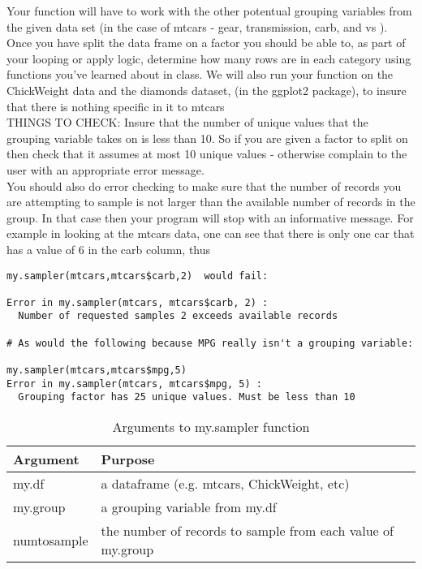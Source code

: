 \documentclass{article}
\begin{document}
Your function will have to work with the other potentual grouping variables from the given data set (in the case of mtcars - gear, transmission,  carb, and vs ). Once you have split the data frame on a factor you should be able to, as part of your looping or apply logic, determine how many rows are in each category using functions you've learned about in class. We will also run your function on the ChickWeight data and the diamonds dataset, (in the ggplot2 package), to insure that there is nothing specific in it to mtcars
\\

THINGS TO CHECK: Insure that the number of unique values that the grouping variable takes on is less than 10. So if you are given a factor to split on then check that it assumes at most 10 unique values - otherwise complain to the user with an appropriate error message. 
\\

You should also do error checking to make sure that the number of records you are attempting to sample is not larger than the available number of records in the group. In that case then your program will stop with an informative message. For example in looking at the mtcars data, one can see that there is only one car that has a value of 6 in the carb column, thus
\begin{verbatim}
my.sampler(mtcars,mtcars$carb,2)  would fail:

Error in my.sampler(mtcars, mtcars$carb, 2) : 
  Number of requested samples 2 exceeds available records 

# As would the following because MPG really isn't a grouping variable:

my.sampler(mtcars,mtcars$mpg,5)
Error in my.sampler(mtcars, mtcars$mpg, 5) : 
  Grouping factor has 25 unique values. Must be less than 10
\end{verbatim}

\begin{table}[ht]
\caption{Arguments to my.sampler function}
\begin{tabular}{l | l}
\hline\hline
Argument & Purpose \\ [1ex]
\hline
my.df & a dataframe (e.g. mtcars, ChickWeight, etc) \\ [1ex]
\hline 
my.group & a grouping variable from my.df \\ [1ex]
\hline
numtosample & the number of records to sample from each value of my.group \\ [1ex]
\hline 
\end{tabular}
\label{table:nonlin}
\end{table}
\end{document}
